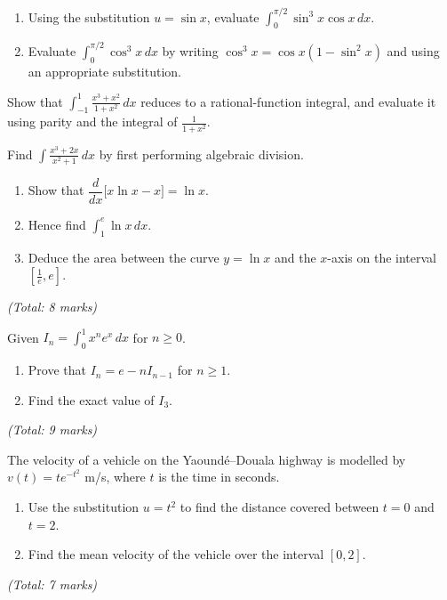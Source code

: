 \documentclass[11pt]{article}
\newcounter{popsec}
\newcounter{popsub}
\newcommand{\courssub}[1]{%
  \stepcounter{popsub}%
  \par\vspace{9pt}\noindent{\popxbold\fontsize{11.5}{13}\selectfont\color{popink}{\color{poporange}\thepopsec.\thepopsub}\hspace{6pt}#1}\par\nopagebreak\vspace{4pt}
}
\begin{document}
\begin{exercice}
\begin{enumerate}
\item Using the substitution $u = \sin x$, evaluate $\displaystyle\int_0^{\pi/2} \sin^3 x \cos x\,dx$.
\item Evaluate $\displaystyle\int_0^{\pi/2} \cos^3 x\,dx$ by writing $\cos^3 x = \cos x(1-\sin^2 x)$ and using an appropriate substitution.
\end{enumerate}
\end{exercice}

\begin{exercice}
Show that $\displaystyle\int_{-1}^{1} \frac{x^3+x^2}{1+x^2}\,dx$ reduces to a rational-function integral, and evaluate it using parity and the integral of $\frac{1}{1+x^2}$.
\end{exercice}

\begin{exercice}
Find $\displaystyle\int \frac{x^3+2x}{x^2+1}\,dx$ by first performing algebraic division.
\end{exercice}

\courssub{I prepare for the GCE}

\begin{exercice}
\begin{enumerate}
\item[(a)] Show that $\dfrac{d}{dx}\bigl[x\ln x - x\bigr] = \ln x$.
\item[(b)] Hence find $\displaystyle\int_1^e \ln x\,dx$.
\item[(c)] Deduce the area between the curve $y = \ln x$ and the $x$-axis on the interval $\left[\frac1e, e\right]$.
\end{enumerate}
\textit{(Total: 8 marks)}
\end{exercice}

\begin{exercice}
Given $I_n = \displaystyle\int_0^1 x^n e^x\,dx$ for $n \ge 0$.
\begin{enumerate}
\item[(a)] Prove that $I_n = e - n I_{n-1}$ for $n \ge 1$.
\item[(b)] Find the exact value of $I_3$.
\end{enumerate}
\textit{(Total: 9 marks)}
\end{exercice}

\begin{exercice}
The velocity of a vehicle on the Yaoundé–Douala highway is modelled by $v(t) = t e^{-t^2}$ m/s, where $t$ is the time in seconds.
\begin{enumerate}
\item[(a)] Use the substitution $u = t^2$ to find the distance covered between $t=0$ and $t=2$.
\item[(b)] Find the mean velocity of the vehicle over the interval $[0,2]$.
\end{enumerate}
\textit{(Total: 7 marks)}
\end{exercice}
\end{document}
